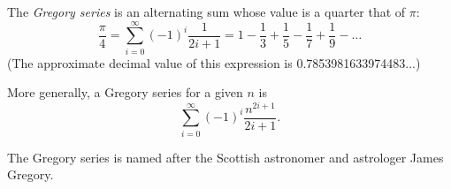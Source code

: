 \documentclass[12pt]{article}
\begin{document}
The {\em Gregory series} is an alternating sum whose value is a quarter that of $\pi$: $$\frac{\pi}{4} = \sum_{i = 0}^\infty (-1)^i \frac{1}{2i + 1} = 1 - \frac{1}{3} + \frac{1}{5} - \frac{1}{7} + \frac{1}{9} - \ldots$$
(The approximate decimal value of this expression is 0.7853981633974483...)

More generally, a Gregory series for a given $n$ is $$\sum_{i = 0}^\infty (-1)^i \frac{n^{2i + 1}}{2i + 1}.$$

The Gregory series is named after the Scottish astronomer and astrologer James Gregory.
\end{document}
